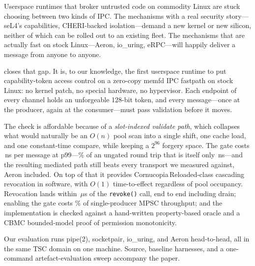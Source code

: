 Userspace runtimes that broker untrusted code on commodity Linux are
stuck choosing between two kinds of IPC. The mechanisms with a real
security story---seL4's capabilities, CHERI-backed isolation---demand a
new kernel or new silicon, neither of which can be rolled out to an
existing fleet. The mechanisms that are actually fast on stock
Linux---Aeron, io\_uring, eRPC---will happily deliver a message from
anyone to anyone.

\sysnamefull closes that gap. It is, to our knowledge, the first
userspace runtime to put capability-token access control on a
zero-copy memfd IPC fastpath on stock Linux: no kernel patch, no
special hardware, no hypervisor. Each endpoint of every channel holds
an unforgeable 128-bit token, and every message---once at the
producer, again at the consumer---must pass validation before it
moves.

The check is affordable because of a \emph{slot-indexed validate
path}, which collapses what would naturally be an $O(n)$ pool scan
into a single shift, one cache load, and one constant-time compare,
while keeping a $2^{96}$ forgery space. The gate costs
\gateOverheadTail\,ns per message at p99---\gateOverheadPercent\% of
an ungated round trip that is itself only \rawAstraRTT\,ns---and the
resulting mediated path still beats every transport we measured
against, Aeron included. On top of that it provides
Cornucopia\,Reloaded-class cascading revocation in software, with
$O(1)$ time-to-effect regardless of pool occupancy. Revocation lands
within \revokeTail\,$\mu$s of the \texttt{revoke()} call, end to end
including drain; enabling the gate costs \mpscGateCostPercent\% of
single-producer MPSC throughput; and the implementation is checked
against a hand-written
property-based oracle and a CBMC bounded-model proof of permission
monotonicity.

Our evaluation runs pipe(2), socketpair, io\_uring, and Aeron
head-to-head, all in the same TSC domain on one machine. Source,
baseline harnesses, and a one-command artefact-evaluation sweep
accompany the paper.
